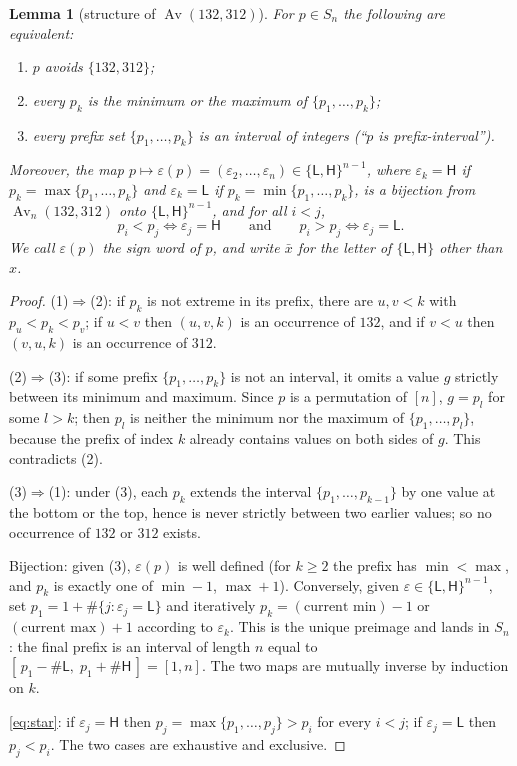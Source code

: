 \documentclass[11pt]{article}
\newtheorem{lemma}[theorem]{Lemma}
\theoremstyle{definition}
\theoremstyle{remark}
\newcommand{\Av}{\operatorname{Av}}
\newcommand{\sL}{\mathsf{L}}
\newcommand{\sH}{\mathsf{H}}
\begin{document}
\begin{lemma}[structure of $\Av(132,312)$]\label{lem:signword}
For $p\in S_n$ the following are equivalent:
\begin{enumerate}
\item $p$ avoids $\{132,312\}$;
\item every $p_k$ is the minimum or the maximum of $\{p_1,\dots,p_k\}$;
\item every prefix set $\{p_1,\dots,p_k\}$ is an interval of integers
  (``$p$ is prefix-interval'').
\end{enumerate}
Moreover, the map
$p\mapsto\varepsilon(p)=(\varepsilon_2,\dots,\varepsilon_n)\in\{\sL,\sH\}^{n-1}$,
where $\varepsilon_k=\sH$ if $p_k=\max\{p_1,\dots,p_k\}$ and
$\varepsilon_k=\sL$ if $p_k=\min\{p_1,\dots,p_k\}$, is a bijection from
$\Av_n(132,312)$ onto $\{\sL,\sH\}^{n-1}$, and for all $i<j$,
\begin{equation}\label{eq:star}
  p_i<p_j \iff \varepsilon_j=\sH
  \qquad\text{and}\qquad
  p_i>p_j \iff \varepsilon_j=\sL.
\end{equation}
We call $\varepsilon(p)$ the \emph{sign word} of $p$, and write
$\bar{x}$ for the letter of $\{\sL,\sH\}$ other than $x$.
\end{lemma}

\begin{proof}
(1)$\Rightarrow$(2): if $p_k$ is not extreme in its prefix, there are
$u,v<k$ with $p_u<p_k<p_v$; if $u<v$ then $(u,v,k)$ is an occurrence of
$132$, and if $v<u$ then $(v,u,k)$ is an occurrence of $312$.

(2)$\Rightarrow$(3): if some prefix $\{p_1,\dots,p_k\}$ is not an interval,
it omits a value $g$ strictly between its minimum and maximum. Since $p$ is
a permutation of $[n]$, $g=p_l$ for some $l>k$; then $p_l$ is neither the
minimum nor the maximum of $\{p_1,\dots,p_l\}$, because the prefix of index
$k$ already contains values on both sides of $g$. This contradicts (2).

(3)$\Rightarrow$(1): under (3), each $p_k$ extends the interval
$\{p_1,\dots,p_{k-1}\}$ by one value at the bottom or the top, hence is
never strictly between two earlier values; so no occurrence of $132$ or
$312$ exists.

Bijection: given (3), $\varepsilon(p)$ is well defined (for $k\ge2$ the
prefix has $\min<\max$, and $p_k$ is exactly one of
$\min-1$, $\max+1$). Conversely, given
$\varepsilon\in\{\sL,\sH\}^{n-1}$, set
$p_1=1+\#\{j:\varepsilon_j=\sL\}$ and iteratively
$p_k=(\text{current min})-1$ or $(\text{current max})+1$ according to
$\varepsilon_k$. This is the unique preimage and lands in $S_n$: the final
prefix is an interval of length $n$ equal to
$[\,p_1-\#\sL,\;p_1+\#\sH\,]=[1,n]$. The two maps are mutually inverse by
induction on $k$.

\eqref{eq:star}: if $\varepsilon_j=\sH$ then
$p_j=\max\{p_1,\dots,p_j\}>p_i$ for every $i<j$; if $\varepsilon_j=\sL$ then
$p_j<p_i$. The two cases are exhaustive and exclusive.
\end{proof}
\end{document}
